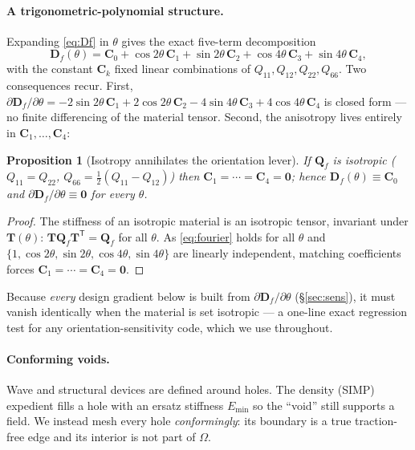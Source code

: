 \documentclass[preprint,11pt]{elsarticle}
\newcommand{\Tp}{^{\mathsf{T}}}
\newcommand{\Df}{\mathbf{D}_f}
\newcommand{\Qf}{\mathbf{Q}_f}
\newcommand{\Tm}{\mathbf{T}}
\theoremstyle{plain}\newtheorem{proposition}{Proposition}
\theoremstyle{remark}\newtheorem{remark}{Remark}
\begin{document}
\paragraph{A trigonometric-polynomial structure.} Expanding \eqref{eq:Df} in $\theta$
gives the exact five-term decomposition
\begin{equation}
  \Df(\theta)=\mathbf C_0+\cos2\theta\,\mathbf C_1+\sin2\theta\,\mathbf C_2
  +\cos4\theta\,\mathbf C_3+\sin4\theta\,\mathbf C_4,
  \label{eq:fourier}
\end{equation}
with the constant $\mathbf C_k$ fixed linear combinations of $Q_{11},Q_{12},Q_{22},
Q_{66}$. Two consequences recur. First, $\partial\Df/\partial\theta=-2\sin2\theta\,\mathbf
C_1+2\cos2\theta\,\mathbf C_2-4\sin4\theta\,\mathbf C_3+4\cos4\theta\,\mathbf C_4$ is
closed form --- no finite differencing of the material tensor. Second, the anisotropy
lives entirely in $\mathbf C_1,\dots,\mathbf C_4$:

\begin{proposition}[Isotropy annihilates the orientation lever]
\label{prop:iso}
If $\Qf$ is isotropic ($Q_{11}=Q_{22}$, $Q_{66}=\tfrac12(Q_{11}-Q_{12})$) then
$\mathbf C_1=\cdots=\mathbf C_4=\mathbf 0$; hence $\Df(\theta)\equiv\mathbf C_0$ and
$\partial\Df/\partial\theta\equiv\mathbf 0$ for every $\theta$.
\end{proposition}
\begin{proof}
The stiffness of an isotropic material is an isotropic tensor, invariant under
$\Tm(\theta)$: $\Tm\Qf\Tm\Tp=\Qf$ for all $\theta$. As \eqref{eq:fourier} holds for all
$\theta$ and $\{1,\cos2\theta,\sin2\theta,\cos4\theta,\sin4\theta\}$ are linearly
independent, matching coefficients forces $\mathbf C_1=\cdots=\mathbf C_4=\mathbf 0$.
\end{proof}

\noindent Because \emph{every} design gradient below is built from
$\partial\Df/\partial\theta$ (\S\ref{sec:sens}), it must vanish identically when the
material is set isotropic --- a one-line exact regression test for any
orientation-sensitivity code, which we use throughout.

\paragraph{Conforming voids.} Wave and structural devices are defined around holes. The
density (SIMP) expedient fills a hole with an ersatz stiffness $E_{\min}$ so the ``void''
still supports a field. We instead mesh every hole \emph{conformingly}: its boundary is a
true traction-free edge and its interior is not part of $\Omega$.
\end{document}
